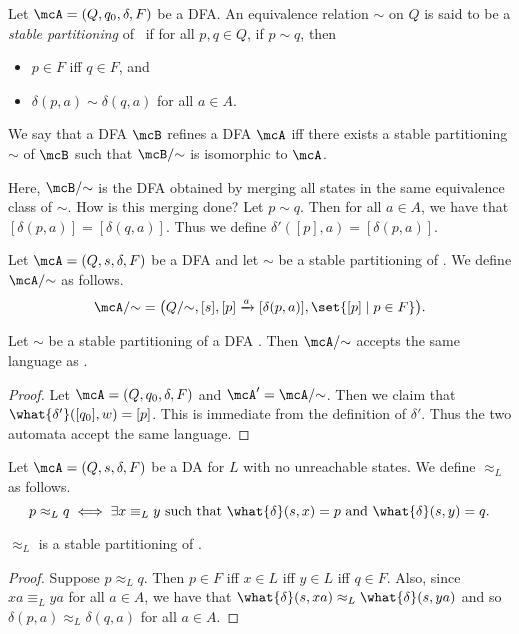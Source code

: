 \begin{definition*} \label{def:stable_partitioning}
    Let $\mcA = (Q, q_0, \delta, F)$ be a DFA.
    An equivalence relation $\sim$ on $Q$ is said to be a
    \emph{stable partitioning} of \mcA\ if for all $p, q \in Q$,
    if $p \sim q$, then
    \begin{itemize}
        \item $p \in F$ iff $q \in F$, and
        \item $\delta(p, a) \sim \delta(q, a)$ for all $a \in A$.
    \end{itemize}
\end{definition*}
\begin{definition*} \label{def:dfa_refinement}
    We say that a DFA $\mcB$ refines a DFA $\mcA$ iff there exists a stable
    partitioning $\sim$ of $\mcB$ such that $\mcB/{\sim}$ is isomorphic to
    $\mcA$.
\end{definition*}
Here, $\mcB/{\sim}$ is the DFA obtained by merging all states in the same
equivalence class of $\sim$.
How is this merging done?
Let $p \sim q$.
Then for all $a \in A$, we have that $[\delta(p, a)] = [\delta(q, a)]$.
Thus we define $\delta'([p], a) = [\delta(p, a)]$.
\begin{definition}
    Let $\mcA = (Q, s, \delta, F)$ be a DFA and let $\sim$ be a stable
    partitioning of \mcA.
    We define $\mcA/{\sim}$ as follows. \[
        \mcA/{\sim} = \big(
            Q/{\sim},
            [s],
            [p] \xrightarrow{a} [\delta(p, a)],
            \set{[p] \mid p \in F}
        \big).
    \]
\end{definition}

\begin{proposition}
    Let $\sim$ be a stable partitioning of a DFA \mcA.
    Then $\mcA/{\sim}$ accepts the same language as \mcA.
\end{proposition}
\begin{proof}
    Let $\mcA = (Q, q_0, \delta, F)$ and $\mcA' = \mcA/{\sim}$.
    Then we claim that $\what{\delta'}([q_0], w) = [p]$.
    This is immediate from the definition of $\delta'$.
    Thus the two automata accept the same language.
\end{proof}

\begin{definition}
    Let $\mcA = (Q, s, \delta, F)$ be a DA for $L$ with no unreachable
    states.
    We define $\approx_L$ as follows. \[
        p \approx_L q \iff \exists x \equiv_L y \text{ such that }
            \what{\delta}(s, x) = p \text{ and } \what{\delta}(s, y) = q.
    \]
\end{definition}
\begin{proposition}
    $\approx_L$ is a stable partitioning of \mcA.
\end{proposition}
\begin{proof}
    Suppose $p \approx_L q$.
    Then $p \in F$ iff $x \in L$ iff $y \in L$ iff $q \in F$.
    Also, since $xa \equiv_L ya$ for all $a \in A$, we have that
    $\what{\delta}(s, xa) \approx_L \what{\delta}(s, ya)$ and so
    $\delta(p, a) \approx_L \delta(q, a)$ for all $a \in A$.
\end{proof}

